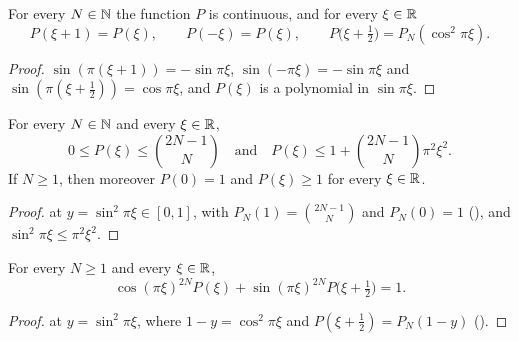\begin{lemma}[Symmetries of $P$]
\label{lem:daub-fun-symmetry}
\leanok
{}
For every $N \in \mathbb{N}$ the function $P$ is continuous, and for every $\xi \in \mathbb{R}$
\[
  P(\xi + 1) = P(\xi), \qquad P(-\xi) = P(\xi), \qquad
  P\bigl(\xi + \tfrac12\bigr) = P_N(\cos^2 \pi\xi) .
\]
\end{lemma}

\begin{proof}
\leanok
$\sin(\pi(\xi + 1)) = -\sin \pi\xi$, $\sin(-\pi\xi) = -\sin \pi\xi$ and
$\sin(\pi(\xi + \frac12)) = \cos \pi\xi$, and $P(\xi)$ is a polynomial in $\sin \pi\xi$.
\end{proof}

\begin{proposition}
\label{prop:daub-fun-bounds}
\leanok
{}
For every $N \in \mathbb{N}$ and every $\xi \in \mathbb{R}$,
\[
  0 \leq P(\xi) \leq \binom{2N-1}{N} \quad\text{and}\quad
  P(\xi) \leq 1 + \binom{2N-1}{N} \pi^2 \xi^2 .
\]
If $N \geq 1$, then moreover $P(0) = 1$ and $P(\xi) \geq 1$ for every $\xi \in \mathbb{R}$.
\end{proposition}

\begin{proof}
\leanok
{}
 at $y = \sin^2 \pi\xi \in [0, 1]$, with $P_N(1) = \binom{2N-1}{N}$
and $P_N(0) = 1$ (), and $\sin^2 \pi\xi \leq \pi^2 \xi^2$.
\end{proof}

\begin{proposition}
\label{prop:daub-fun-bezout}
\leanok
{}
For every $N \geq 1$ and every $\xi \in \mathbb{R}$,
\[
  \cos(\pi\xi)^{2N} P(\xi) + \sin(\pi\xi)^{2N} P\bigl(\xi + \tfrac12\bigr) = 1 .
\]
\end{proposition}

\begin{proof}
\leanok
{}
 at $y = \sin^2 \pi\xi$, where $1 - y = \cos^2 \pi\xi$ and
$P(\xi + \frac12) = P_N(1 - y)$ ().
\end{proof}

